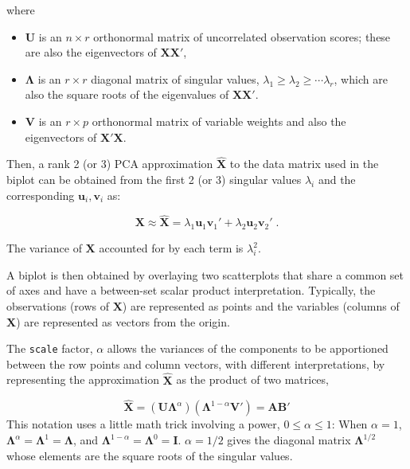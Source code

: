 \documentclass[
  letterpaper,
  10pt,
  krantz2]{krantz}
\providecommand{\tightlist}{%
  \setlength{\itemsep}{0pt}\setlength{\parskip}{0pt}}\usepackage{longtable,booktabs,array}
\begin{document}
where

\begin{itemize}
\tightlist
\item
  \(\mathbf{U}\) is an \(n \times r\) orthonormal matrix of uncorrelated
  observation scores; these are also the eigenvectors of
  \(\mathbf{X} \mathbf{X}'\),
\item
  \(\mathbf{\Lambda}\) is an \(r \times r\) diagonal matrix of singular
  values, \(\lambda_1 \ge \lambda_2 \ge \cdots \lambda_r\), which are
  also the square roots of the eigenvalues of
  \(\mathbf{X} \mathbf{X}'\).
\item
  \(\mathbf{V}\) is an \(r \times p\) orthonormal matrix of variable
  weights and also the eigenvectors of \(\mathbf{X}' \mathbf{X}\).
\end{itemize}

Then, a rank 2 (or 3) PCA approximation \(\widehat{\mathbf{X}}\) to the
data matrix used in the biplot can be obtained from the first 2 (or 3)
singular values \(\lambda_i\) and the corresponding
\(\mathbf{u}_i, \mathbf{v}_i\) as:

\[
\mathbf{X} \approx \widehat{\mathbf{X}} = \lambda_1 \mathbf{u}_1 \mathbf{v}_1' + \lambda_2 \mathbf{u}_2 \mathbf{v}_2' \; .
\]

The variance of \(\mathbf{X}\) accounted for by each term is
\(\lambda_i^2\).

A biplot is then obtained by overlaying two scatterplots that share a
common set of axes and have a between-set scalar product interpretation.
Typically, the observations (rows of \(\mathbf{X}\)) are represented as
points and the variables (columns of \(\mathbf{X}\)) are represented as
vectors from the origin.

The \texttt{scale} factor, \(\alpha\) allows the variances of the
components to be apportioned between the row points and column vectors,
with different interpretations, by representing the approximation
\(\widehat{\mathbf{X}}\) as the product of two matrices,

\[
\widehat{\mathbf{X}} = (\mathbf{U} \mathbf{\Lambda}^\alpha) (\mathbf{\Lambda}^{1-\alpha} \mathbf{V}') = \mathbf{A} \mathbf{B}'
\] This notation uses a little math trick involving a power,
\(0 \le \alpha \le 1\): When \(\alpha = 1\),
\(\mathbf{\Lambda}^\alpha = \mathbf{\Lambda}^1  =\mathbf{\Lambda}\), and
\(\mathbf{\Lambda}^{1-\alpha} = \mathbf{\Lambda}^0  =\mathbf{I}\).
\(\alpha = 1/2\) gives the diagonal matrix \(\mathbf{\Lambda}^{1/2}\)
whose elements are the square roots of the singular values.
\end{document}

